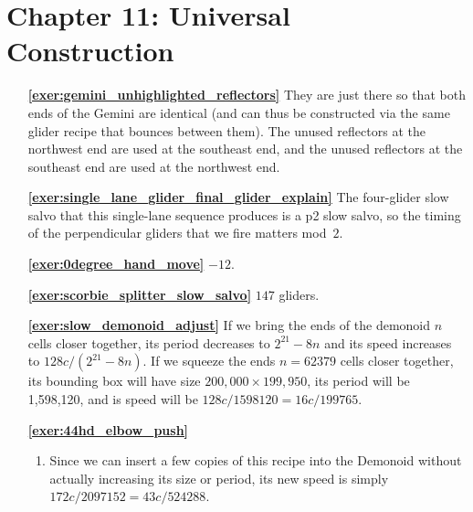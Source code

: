 \hypertarget{solutions_universal_construction}{}\label{solutions_universal_construction}
\section*{Chapter 11: Universal Construction}
\renewcommand{\chapterfolder}{universal_construction/}

\begin{multicols}{2}
	\begin{itemize}[leftmargin=0em]
		\item[\bf\color{ocre}\sffamily\ref{exer:gemini_unhighlighted_reflectors}] They are just there so that both ends of the Gemini are identical (and can thus be constructed via the same glider recipe that bounces between them). The unused reflectors at the northwest end are used at the southeast end, and the unused reflectors at the southeast end are used at the northwest end.\\
		
		\item[\bf\color{ocre}\sffamily\ref{exer:single_lane_glider_final_glider_explain}] The four-glider slow salvo that this single-lane sequence produces is a p2 slow salvo, so the timing of the perpendicular gliders that we fire matters mod~$2$.\\
		
		\item[\bf\color{ocre}\sffamily\ref{exer:0degree_hand_move}] $-12$.\\
		
		\item[\bf\color{ocre}\sffamily\ref{exer:scorbie_splitter_slow_salvo}] $147$ gliders.\\
		
		\item[\bf\color{ocre}\sffamily\ref{exer:slow_demonoid_adjust}] If we bring the ends of the demonoid $n$ cells closer together, its period decreases to $2^{21} - 8n$ and its speed increases to $128c/(2^{21} - 8n)$. If we squeeze the ends $n = 62379$ cells closer together, its bounding box will have size $200,000 \times 199,950$, its period will be 1,598,120, and is speed will be $128c/1598120 = 16c/199765$.\\
		
		\item[\bf\color{ocre}\sffamily\ref{exer:44hd_elbow_push}] \begin{enumerate}[leftmargin=1.5em,label=\bf\color{ocre}(\alph*)]
			\item Since we can insert a few copies of this recipe into the Demonoid without actually increasing its size or period, its new speed is simply $172c/2097152 = 43c/524288$.
			

\end{enumerate}
\end{itemize}
\end{multicols}
